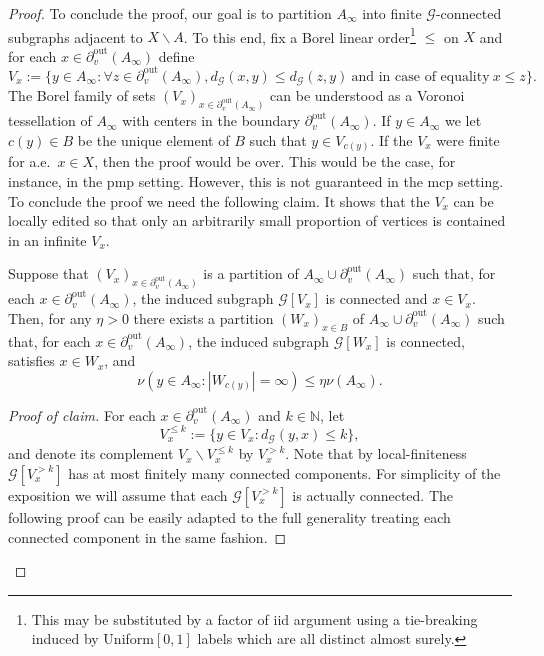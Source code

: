 \documentclass[10pt,a4paper]{amsart}
\renewcommand{\leq}{\leqslant}
\begin{document}
\begin{proof}
    To conclude the proof, our goal is to partition $A_\infty$ into finite $\mathcal G$-connected subgraphs adjacent to $X\backslash A$.  To this end, fix a Borel linear order\footnote{This may be substituted by a factor of iid argument using a tie-breaking induced by Uniform$[0,1]$ labels which are all distinct almost surely.} $\leq$ on $X$ and for each $x \in \partial_v^{\mathrm{out}} (A_\infty)$ define 
    \begin{equation}\label{eq:voronoi}
        V_{x} := \{ y \in A_\infty : \forall z \in \partial_v^{\mathrm{out}} (A_\infty), d_{\mathcal{G}} (x,y) \leq d _{\mathcal{G}} (z,y)\ \text{and in case of equality}\ x \leq z\}.
    \end{equation}
    The Borel family of sets $(V_{x})_{x\in \partial_v^{\mathrm{out}} (A_\infty)}$ can be understood as a Voronoi tessellation of $A_\infty$ with centers in the boundary $\partial_v^{\mathrm{out}} (A_\infty)$. If $y \in A_\infty$ we let $c(y) \in B$ be the unique element of $B$ such that $y\in V_{c(y)}$. If the $V_{x}$ were finite for a.e.\ $x\in X$, then the proof would be over. This would be the case, for instance, in the pmp setting. However, this is not guaranteed in the mcp setting. To conclude the proof we need the following claim. It shows that the $V_x$ can be locally edited so that only an arbitrarily small proportion of vertices is contained in an infinite $V_x$. 

    \begin{claim}\label{claim:partition}
        Suppose that $(V_x)_{x\in \partial_v^{\mathrm{out}} (A_\infty)}$ is a partition of $A_\infty \cup \partial_v^{\mathrm{out}} (A_\infty)$ such that, for each $x\in \partial_v^{\mathrm{out}} (A_\infty)$, the induced subgraph $\mathcal G[V_x]$ is connected and $x\in V_x$. Then, for any $\eta > 0$ there exists a partition $(W_x)_{x\in B}$ of $A_\infty \cup \partial_v^{\mathrm{out}} (A_\infty)$ such that, for each $x\in \partial_v^{\mathrm{out}} (A_\infty)$, the induced subgraph $\mathcal G[W_{x}]$ is connected, satisfies $x\in W_x$, and 
        $$
            \nu\left(y \in A_\infty :  |W_{c(y)}|=\infty\right)\leq \eta \nu (A_\infty).
        $$
    \end{claim}

    \begin{proof}[Proof of claim]
     For each $x\in \partial_v^{\mathrm{out}} (A_\infty)$ and $k\in \mathbb N$, let $$
     V_x^{\leq k}:= \{y\in V_x : d_{\mathcal G} (y,x) \leq k\},
     $$
     and denote its complement $V_x \backslash V_{x}^{\leq k}$ by $V_x^{> k}$. Note that by local-finiteness $\mathcal G [V_x^{>k}]$ has at most finitely many connected components. For simplicity of the exposition we will assume that each $\mathcal G[V_x^{>k}]$ is actually connected. The following proof can be easily adapted to the full generality treating each connected component in the same fashion. 
     

\end{proof}
\end{proof}
\end{document}
